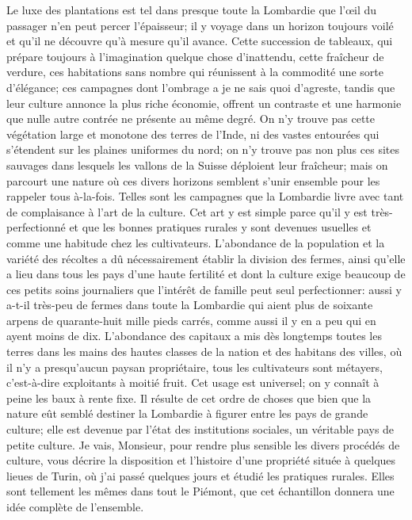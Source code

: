 Le luxe des plantations est tel dans presque toute la Lombardie que l'œil du passager n'en peut percer l'épaisseur; il y voyage dans un horizon toujours voilé et qu'il ne découvre qu'à mesure qu'il avance. Cette succession de tableaux, qui prépare toujours à l'imagination quelque chose d'inattendu, cette fraîcheur de verdure, ces habitations sans nombre qui réunissent à la commodité une sorte d'élégance; ces campagnes dont l'ombrage a je ne sais quoi d'agreste, tandis que leur culture annonce la plus riche économie, offrent un contraste et une harmonie que nulle autre contrée ne présente au même degré. On n'y trouve pas cette végétation large et monotone des\setcounter{page}{394} terres de l'Inde, ni des vastes entourées qui s'étendent sur les plaines uniformes du nord; on n'y trouve pas non plus ces sites sauvages dans lesquels les vallons de la Suisse déploient leur fraîcheur; mais on parcourt une nature où ces divers horizons semblent s'unir ensemble pour les rappeler tous à-la-fois. Telles sont les campagnes que la Lombardie livre avec tant de complaisance à l'art de la culture. Cet art y est simple parce qu'il y est très-perfectionné et que les bonnes pratiques rurales y sont devenues usuelles et comme une habitude chez les cultivateurs. L'abondance de la population et la variété des récoltes a dû nécessairement établir la division des fermes, ainsi qu'elle a lieu dans tous les pays d'une haute fertilité et dont la culture exige beaucoup de ces petits soins journaliers que l'intérêt de famille peut seul perfectionner: aussi y a-t-il très-peu de fermes dans toute la Lombardie qui aient plus de soixante arpens de quarante-huit mille pieds carrés, comme aussi il y en a peu qui en ayent moins de dix. L'abondance des capitaux a mis dès longtemps toutes les terres dans les mains des hautes classes de la nation et des habitans des villes, où il n'y a presqu'aucun paysan\setcounter{page}{395} propriétaire, tous les cultivateurs sont métayers, c'est-à-dire exploitants à moitié fruit. Cet usage est universel; on y connaît à peine les baux à rente fixe.
Il résulte de cet ordre de choses que bien que la nature eût semblé destiner la Lombardie à figurer entre les pays de grande culture; elle est devenue par l'état des institutions sociales, un véritable pays de petite culture.
Je vais, Monsieur, pour rendre plus sensible les divers procédés de culture, vous décrire la disposition et l'histoire d'une propriété située à quelques lieues de Turin, où j'ai passé quelques jours et étudié les pratiques rurales. Elles sont tellement les mêmes dans tout le Piémont, que cet échantillon donnera une idée complète de l'ensemble.

